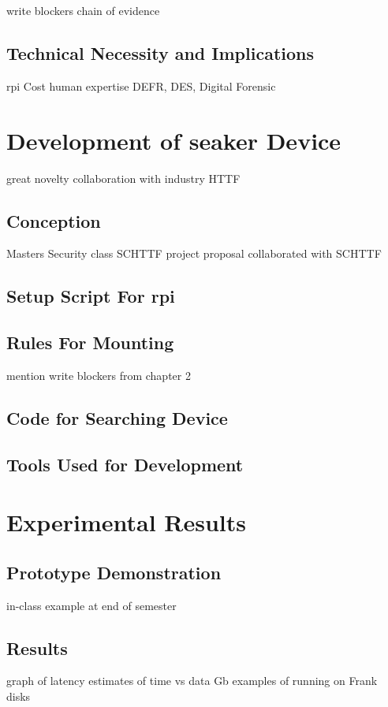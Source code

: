 \documentclass[12pt]{article}
\begin{document}
write blockers
chain of evidence
\subsection{Technical Necessity and Implications}
\gls{rpi}
Cost 
human expertise
DEFR, DES, Digital Forensic 



\section{Development of \gls{seaker} Device}
\label{sect-developmentSeakerDevice}
great novelty
collaboration with industry HTTF
\subsection{Conception}
Masters Security class
SCHTTF project proposal
collaborated with SCHTTF
\subsection{Setup Script For \gls{rpi}}

\subsection{Rules For Mounting}
mention write blockers from chapter 2
\subsection{Code for Searching Device}

\subsection{Tools Used for Development}


\section{Experimental Results}
\label{sect-experimentalResults}

\subsection{Prototype Demonstration}
in-class example at end of semester
\subsection{Results}
graph of latency
estimates of time vs data Gb
examples of running on Frank disks
\end{document}
